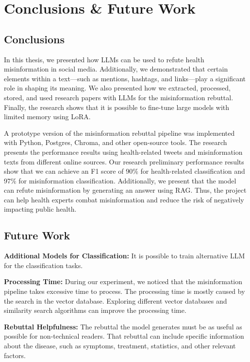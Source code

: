 



\chapter{Conclusions \& Future Work}  

\section{Conclusions}
\noindent In this thesis, we presented how LLMs can be used to refute health misinformation in social media. Additionally, we demonstrated that certain elements within a text—such as mentions, hashtags, and links—play a significant role in shaping its meaning. We also presented how we extracted, processed, stored, and used research papers with LLMs for the misinformation rebuttal. Finally, the research shows that it is possible to fine-tune large models with limited memory using LoRA.

A prototype version of the misinformation rebuttal pipeline was implemented with Python, Postgres, Chroma, and other open-source tools. The research presents the performance results using health-related tweets and misinformation texts from different online sources. Our research preliminary performance results show that we can achieve an F1 score of 90\% for health-related classification and 97\% for misinformation classification. Additionally, we present that the model can refute misinformation by generating an answer using RAG. Thus, the project can help health experts combat misinformation and reduce the risk of negatively impacting public health.

\section{Future Work}

\begin{description}

\item{\textbf{Additional Models for Classification:}} It is possible to train alternative LLM  for the classification tasks.

\item{\textbf{Processing Time:}} During our experiment, we noticed that the misinformation pipeline takes excessive time to process. The processing time is mostly caused by the search in the vector database. Exploring different vector databases and similarity search algorithms can improve the processing time.

\item{\textbf{Rebuttal Helpfulness:}} The rebuttal the model generates must be as useful as possible for non-technical readers. That rebuttal can include specific information about the disease, such as symptoms, treatment, statistics, and other relevant factors.

\end{description}